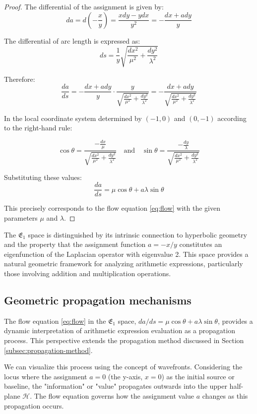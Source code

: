 \begin{proof}
The differential of the assignment is given by:
$$
da = d\left(-\frac{x}{y}\right) = \frac{xdy - ydx}{y^2} = -\frac{dx + a dy}{y}
$$

The differential of arc length is expressed as:
$$
ds = \frac{1}{y}\sqrt{\frac{dx^2}{\mu^2} + \frac{dy^2}{\lambda^2}}
$$

Therefore:
$$
\frac{da}{ds} = - \frac{dx + a dy}{y} \cdot \frac{y}{\sqrt{\frac{dx^2}{\mu^2} + \frac{dy^2}{\lambda^2}}} = -\frac{dx + a dy}{\sqrt{\frac{dx^2}{\mu^2} + \frac{dy^2}{\lambda^2}}}
$$

In the local coordinate system determined by $(-1, 0)$ and $(0, -1)$ according to the right-hand rule:

$$
\cos \theta = \frac{-\frac{dx}{\mu}}{\sqrt{\frac{dx^2}{\mu^2} + \frac{dy^2}{\lambda^2}}} \quad \text{and} \quad \sin \theta = \frac{-\frac{dy}{\lambda}}{\sqrt{\frac{dx^2}{\mu^2} + \frac{dy^2}{\lambda^2}}}
$$

Substituting these values:
$$
\frac{da}{ds} = \mu \cos \theta + a \lambda \sin \theta
$$

This precisely corresponds to the flow equation \eqref{eq:flow} with the given parameters $\mu$ and $\lambda$.
\end{proof}

The $\mathfrak{E}_1$ space is distinguished by its intrinsic connection to hyperbolic geometry and the property that the assignment function $a = -x/y$ constitutes an eigenfunction of the Laplacian operator with eigenvalue 2. This space provides a natural geometric framework for analyzing arithmetic expressions, particularly those involving addition and multiplication operations.

\subsection{Geometric propagation mechanisms}\label{subsec:geompropagation}

The flow equation \eqref{eq:flow} in the $\mathfrak{E}_1$ space, $da/ds = \mu \cos \theta + a \lambda \sin \theta$, provides a dynamic interpretation of arithmetic expression evaluation as a propagation process. This perspective extends the propagation method discussed in Section \ref{subsec:propagation-method}.

We can visualize this process using the concept of wavefronts. Considering the locus where the assignment $a=0$ (the y-axis, $x=0$) as the initial source or baseline, the "information" or "value" propagates outwards into the upper half-plane $\mathcal{H}$. The flow equation governs how the assignment value $a$ changes as this propagation occurs.

